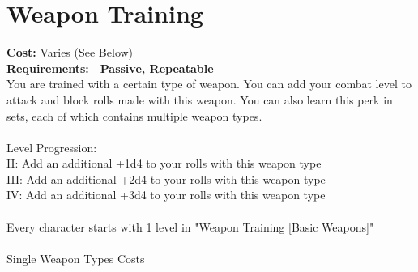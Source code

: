\section{Weapon Training}
\textbf{Cost:} Varies (See Below)\\
\textbf{Requirements:} -
\textbf{Passive, Repeatable}\\

You are trained with a certain type of weapon. You can add your combat level to attack and block rolls made with this weapon. You can also learn this perk in sets, each of which contains multiple weapon types.\\
\\
Level Progression:\\
II: Add an additional +1d4 to your rolls with this weapon type\\
III: Add an additional +2d4 to your rolls with this weapon type\\
IV: Add an additional +3d4 to your rolls with this weapon type\\
\\
Every character starts with 1 level in "Weapon Training [Basic Weapons]"\\
\\
Single Weapon Types Costs\\
